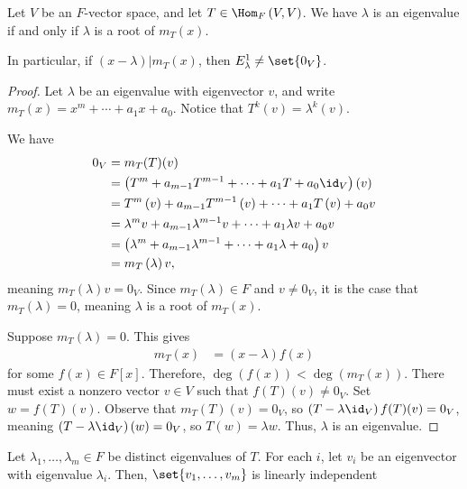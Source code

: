 \documentclass[10pt]{mypackage}
\begin{document}
\begin{theorem}
  Let $V$ be an $F$-vector space, and let $T\in \Hom_{F}\left(V,V\right)$. We have $\lambda$ is an eigenvalue if and only if $\lambda$ is a root of $m_{T}\left(x\right)$.\newline

  In particular, if $\left(x-\lambda\right)\vert m_T(x)$, then $E^{1}_{\lambda}\neq \set{0_V}$.
\end{theorem}
\begin{proof}
  Let $\lambda$ be an eigenvalue with eigenvector $v$, and write $m_{T}\left(x\right) = x^m + \cdots + a_1x + a_0$. Notice that $T^{k}\left(v\right) = \lambda^{k}\left(v\right)$.\newline

  We have 
  \begin{align*}
    0_V &= m_T(T)(v)\\
        &= \left(T^{m} + a_{m-1}T^{m-1} + \cdots + a_1T + a_0\id_V\right)\left(v\right)\\
        &= T^{m}\left(v\right) + a_{m-1}T^{m-1}\left(v\right) + \cdots + a_1T\left(v\right) + a_0 v\\
        &= \lambda^{m}v + a_{m-1}\lambda^{m-1}v + \cdots + a_1\lambda v + a_0 v\\
        &= \left(\lambda^{m} + a_{m-1}\lambda^{m-1} + \cdots + a_1\lambda + a_0\right)v\\
        &= m_{T}\left(\lambda\right)v,
  \end{align*}
  meaning $m_T\left(\lambda\right)v = 0_V$. Since $m_T\left(\lambda\right)\in F$ and $v \neq 0_V$, it is the case that $m_T\left(\lambda\right) = 0$, meaning $\lambda$ is a root of $m_T(x)$.\newline

  Suppose $m_T\left(\lambda\right) = 0$. This gives
  \begin{align*}
    m_T\left(x\right) &= \left(x-\lambda\right)f(x)
  \end{align*}
  for some $f(x)\in F[x]$. Therefore, $\deg\left(f(x)\right) < \deg \left(m_{T}\left(x\right)\right)$. There must exist a nonzero vector $v\in V$ such that $f(T)(v) \neq 0_V$. Set $w = f(T)(v)$. Observe that $m_T(T)(v) = 0_V$, so $\left(T-\lambda\id_V\right)f(T)(v) = 0_V$, meaning $\left(T-\lambda\id_V\right)\left(w\right) = 0_V$, so $T(w) = \lambda w$. Thus, $\lambda$ is an eigenvalue.
\end{proof}
\begin{corollary}
  Let $\lambda_1,\dots,\lambda_m\in F$ be distinct eigenvalues of $T$. For each $i$, let $v_i$ be an eigenvector with eigenvalue $\lambda_i$. Then, $\set{v_1,\dots,v_m}$ is linearly independent 
\end{corollary}
\end{document}
